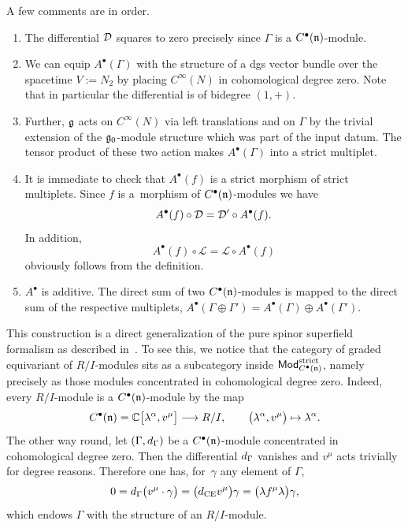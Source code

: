 \documentclass[11pt]{article}
\numberwithin{equation}{section}
\numberwithin{equation}{section}
\def\cat#1{\ensuremath{\mathsf{#1}}}
\DeclareMathOperator{\Mod}{\cat{Mod}}
\def\d{{\rm d}}
\def\sL{\mathscr L}
\begin{document}
A few comments are in order.

\begin{enumerate}\itemsep=0pt
	\item The differential $\mathcal D$ squares to zero precisely since $\Gamma$ is a $C^\bullet(\mathfrak n)$-module.
	\item We can equip $A^\bullet(\Gamma)$ with the structure of a dgs vector bundle over the spacetime $V := N_2$ by placing $C^\infty(N)$ in cohomological degree zero. Note that in particular the differential is of bidegree $(1,+)$.
	
	\item Further, $\mathfrak g$ acts on $C^\infty(N)$ via left translations and on $\Gamma$ by the trivial extension of the $\mathfrak g_0$-module structure which was part of the input datum. The tensor product of these two action makes $A^\bullet(\Gamma)$ into a strict multiplet.
	\item It is immediate to check that $A^\bullet(f)$ is a strict morphism of strict multiplets. Since $f$ is a~morphism of $C^\bullet(\mathfrak n)$-modules we have
	\begin{equation*}
	A^\bullet(f) \circ \mathcal D = \mathcal D' \circ A^\bullet(f) .
	\end{equation*}
	In addition,
	\begin{equation*}
	A^\bullet(f) \circ \sL = \sL \circ A^\bullet(f)
	\end{equation*}
	obviously follows from the definition.
	\item $A^\bullet$ is additive. The direct sum of two $C^\bullet(\mathfrak n)$-modules is mapped to the direct sum of the respective multiplets, $A^\bullet(\Gamma \oplus \Gamma') = A^\bullet(\Gamma) \oplus A^\bullet(\Gamma')$.
\end{enumerate}

This construction is a direct generalization of the pure spinor superfield formalism as described in~\cite{perspectives}. To see this, we notice that the category of graded equivariant of $R/I$-modules sits as a subcategory inside $\Mod_{C^\bullet(\fn)}^{\mathrm{strict}}$, namely precisely as those modules concentrated in cohomological degree zero. Indeed, every $R/I$-module is a $C^\bullet(\mathfrak n)$-module by the map
\begin{equation*}
C^\bullet(\mathfrak n) = \mathbb C\big[\lambda^\alpha,v^\mu\big] \longrightarrow R/I, \qquad \big(\lambda^\alpha , v^\mu\big) \mapsto \lambda^\alpha .
\end{equation*}
The other way round, let $(\Gamma , \d_\Gamma)$ be a $C^\bullet(\mathfrak n)$-module concentrated in cohomological degree zero. Then the differential $\d_\Gamma$ vanishes and $v^\mu$ acts trivially for degree reasons. Therefore one has, for~$\gamma$ any element of $\Gamma$,
\begin{equation*}
0 = \d_\Gamma \big(v^\mu \cdot \gamma\big) = \big(\d_{\mathrm{CE}} v^\mu\big) \gamma = \big(\lambda f^\mu \lambda\big) \gamma ,
\end{equation*}
which endows $\Gamma$ with the structure of an $R/I$-module.
\end{document}
